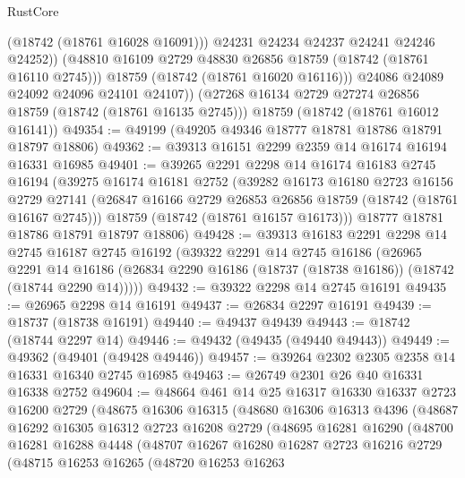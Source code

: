 \begin{lexlean}{RustCore}
\begin{coremodule}
                (@18742 (@18761 @16028 @16091)))
              @24231
              @24234
              @24237
              @24241
              @24246
              @24252))
          (@48810 @16109 @2729 @48830 @26856 @18759 (@18742 (@18761 @16110 @2745)))
          @18759
          (@18742 (@18761 @16020 @16116)))
        @24086
        @24089
        @24092
        @24096
        @24101
        @24107))
    (@27268 @16134 @2729 @27274 @26856 @18759 (@18742 (@18761 @16135 @2745)))
    @18759
    (@18742 (@18761 @16012 @16141))
@49354 := @49199 (@49205 @49346 @18777 @18781 @18786 @18791 @18797 @18806)
@49362 := @39313 @16151 @2299 @2359 @14 @16174 @16194 @16331 @16985
@49401 := @39265
    @2291
    @2298
    @14
    @16174
    @16183
    @2745
    @16194
    (@39275
      @16174
      @16181
      @2752
      (@39282
        @16173
        @16180
        @2723
        @16156
        @2729
        @27141
        (@26847 @16166 @2729 @26853 @26856 @18759 (@18742 (@18761 @16167 @2745)))
        @18759
        (@18742 (@18761 @16157 @16173)))
      @18777
      @18781
      @18786
      @18791
      @18797
      @18806)
@49428 := @39313
    @16183
    @2291
    @2298
    @14
    @2745
    @16187
    @2745
    @16192
    (@39322
      @2291
      @14
      @2745
      @16186
      (@26965
        @2291
        @14
        @16186
        (@26834 @2290 @16186 (@18737 (@18738 @16186)) (@18742 (@18744 @2290 @14)))))
@49432 := @39322 @2298 @14 @2745 @16191
@49435 := @26965 @2298 @14 @16191
@49437 := @26834 @2297 @16191
@49439 := @18737 (@18738 @16191)
@49440 := @49437 @49439
@49443 := @18742 (@18744 @2297 @14)
@49446 := @49432 (@49435 (@49440 @49443))
@49449 := @49362 (@49401 (@49428 @49446))
@49457 := @39264 @2302 @2305 @2358 @14 @16331 @16340 @2745 @16985
@49463 := @26749 @2301 @26 @40 @16331 @16338 @2752
@49604 := @48664
    @461
    @14
    @25
    @16317
    @16330
    @16337
    @2723
    @16200
    @2729
    (@48675
      @16306
      @16315
      (@48680
        @16306
        @16313
        @4396
        (@48687
          @16292
          @16305
          @16312
          @2723
          @16208
          @2729
          (@48695
            @16281
            @16290
            (@48700
              @16281
              @16288
              @4448
              (@48707
                @16267
                @16280
                @16287
                @2723
                @16216
                @2729
                (@48715
                  @16253
                  @16265
                  (@48720
                    @16253
                    @16263

\end{coremodule}
\end{lexlean}
